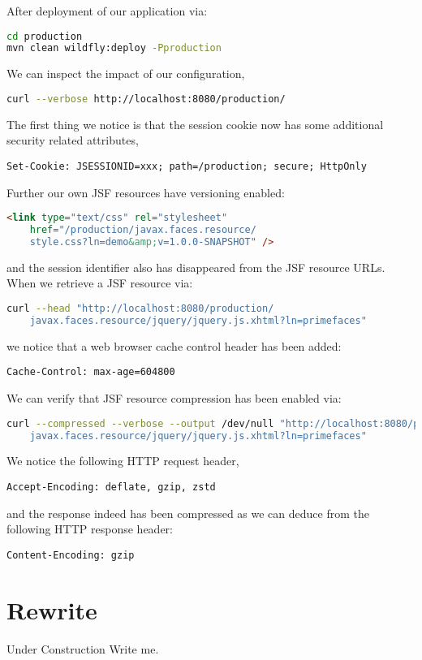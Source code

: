 After deployment of our application via:
\begin{lstlisting}[language=bash]
cd production
mvn clean wildfly:deploy -Pproduction
\end{lstlisting}
We can inspect the impact of our configuration,
\begin{lstlisting}[language=bash]
curl --verbose http://localhost:8080/production/
\end{lstlisting}
The first thing we notice is that the session cookie now has some additional security related attributes,
\begin{lstlisting}
Set-Cookie: JSESSIONID=xxx; path=/production; secure; HttpOnly
\end{lstlisting}
Further our own JSF resources have versioning enabled:
\begin{lstlisting}[language=html]
<link type="text/css" rel="stylesheet"
	href="/production/javax.faces.resource/
	style.css?ln=demo&amp;v=1.0.0-SNAPSHOT" />
\end{lstlisting}
and the session identifier also has disappeared from the JSF resource URLs.
When we retrieve a JSF resource via:
\begin{lstlisting}[language=bash]
curl --head "http://localhost:8080/production/
	javax.faces.resource/jquery/jquery.js.xhtml?ln=primefaces"
\end{lstlisting}
we notice that a web browser cache control header has been added:
\begin{lstlisting}
Cache-Control: max-age=604800
\end{lstlisting}
We can verify that JSF resource compression has been enabled via:
\begin{lstlisting}[language=bash]
curl --compressed --verbose --output /dev/null "http://localhost:8080/production/
	javax.faces.resource/jquery/jquery.js.xhtml?ln=primefaces"
\end{lstlisting}
We notice the following HTTP request header,
\begin{lstlisting}
Accept-Encoding: deflate, gzip, zstd
\end{lstlisting}
and the response indeed has been compressed as we can deduce from the following HTTP response header:
\begin{lstlisting}
Content-Encoding: gzip
\end{lstlisting}

\section{Rewrite}

\begin{TODO}{Under Construction}
	Write me.
\end{TODO}